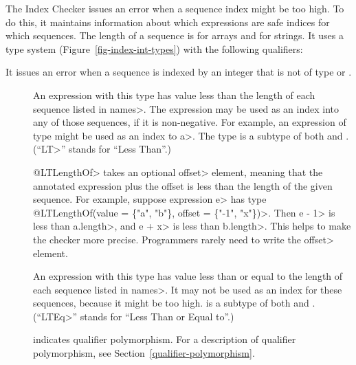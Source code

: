 The Index Checker issues an error when a sequence index might be
too high. To do this, it maintains information about which expressions are
safe indices for which sequences.
The length of a sequence is  for arrays and
 for strings.
It uses a type system (Figure~\ref{fig-index-int-types}) with the following
qualifiers:

It issues an error when a sequence 
is indexed by an integer that is not of type 
or .

\begin{description}

\item[]
  An expression with this type
  has value less than the length of each sequence listed in \<names>.
  The expression may be used as an index into any of those sequences,
  if it is non-negative.
  For example, an expression of type  might be
  used as an index to \<a>.
  The type  is a subtype of both
   and .
  (``\<LT>'' stands for ``Less Than''.)

  \<@LTLengthOf> takes an optional \<offset> element, meaning that the
  annotated expression plus the offset is less than the length of the given
  sequence.  For example, suppose expression \<e> has type \<@LTLengthOf(value
  = \{"a", "b"\}, offset = \{"-1", "x"\})>. Then \<e - 1> is less than
  \<a.length>, and \<e + x> is less than \<b.length>.  This helps to make
  the checker more precise.  Programmers rarely need to write the \<offset>
  element.

\item[]
  An expression with this type
  has value less than or equal to the length of each sequence listed in \<names>.
  It may not be used as an index for these sequences, because it might be too high.
   is a subtype of both
   and .
  (``\<LTEq>'' stands for ``Less Than or Equal to''.)

 \item[]
   indicates qualifier polymorphism.
   For a description of qualifier polymorphism, see
   Section~\ref{qualifier-polymorphism}.


\end{description}
